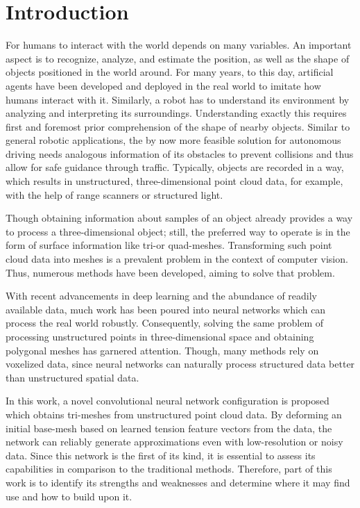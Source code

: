 
\chapter{Introduction}
  For humans to interact with the world depends on many variables. 
  An important aspect is to recognize, analyze, and estimate the position,
  as well as the shape of objects positioned in the world around. For many years,
  to this day, artificial agents have been developed and deployed in the real world\cite{1087032,10.1007978-981-13-0224-4_40} 
  to imitate how humans interact with it. Similarly, a robot has to understand its environment
  by analyzing and interpreting its surroundings. Understanding exactly this requires first and 
  foremost prior comprehension of the shape of nearby objects. 
  Similar to general robotic applications, the by now more feasible solution for autonomous driving
  needs analogous information of its obstacles to prevent collisions and thus allow for safe guidance
  through traffic.
  Typically, objects are recorded in a way, which results in unstructured, three-dimensional point
  cloud data, for example, with the help of range scanners or structured light.


  Though obtaining information about samples of an object already provides a way to process a three-dimensional object;
  still, the preferred way to operate is in the form of surface information like tri-or quad-meshes.
  Transforming such point cloud data into meshes is a prevalent problem in the context of computer vision. Thus, numerous
  methods have been developed, aiming to solve that problem\cite{817351,Jakob2015Instant}.

  With recent advancements in deep learning and the abundance of readily available data, much work has been poured
  into neural networks which can process the real world robustly. Consequently, solving the same problem of processing 
  unstructured points in three-dimensional space and obtaining polygonal meshes has garnered attention. Though, many methods 
  rely on voxelized data, since neural networks can naturally process structured data better than unstructured spatial data.

  In this work, a novel convolutional neural network configuration is proposed which obtains tri-meshes from unstructured point cloud data.
  By deforming an initial base-mesh based on learned tension feature vectors from the data, the network can reliably generate approximations
  even with low-resolution or noisy data. 
  Since this network is the first of its kind, it is essential to assess its capabilities in comparison to the traditional methods. 
  Therefore, part of this work is to identify its strengths and weaknesses and determine where it may find use and how to build upon it.

